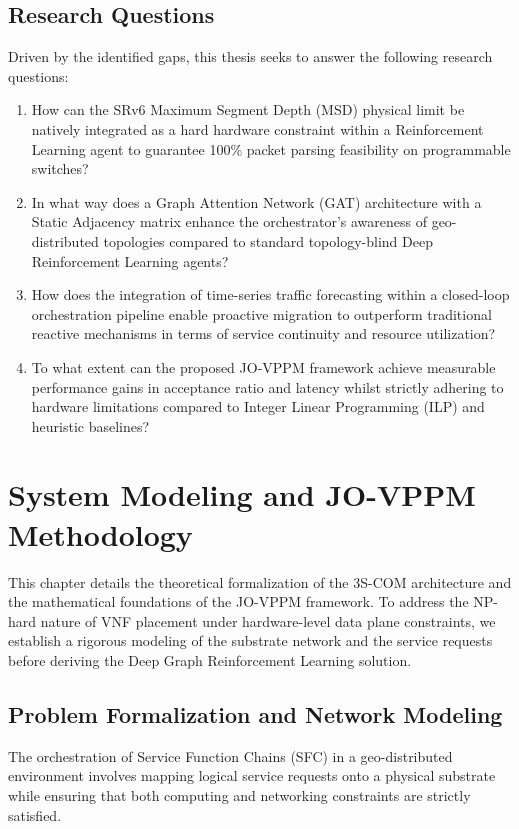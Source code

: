 \documentclass[12pt, a4paper, reqno, oneside]{book}
\begin{document}
\section{Research Questions}
\label{sec:rqs}
Driven by the identified gaps, this thesis seeks to answer the following research questions:

\begin{enumerate}[label=RQ\arabic*., leftmargin=*, nosep]
    \item How can the SRv6 Maximum Segment Depth (MSD) physical limit be natively integrated as a hard hardware constraint within a Reinforcement Learning agent to guarantee 100\% packet parsing feasibility on programmable switches?
    
    \item In what way does a Graph Attention Network (GAT) architecture with a Static Adjacency matrix enhance the orchestrator's awareness of geo-distributed topologies compared to standard topology-blind Deep Reinforcement Learning agents?
    
    \item How does the integration of time-series traffic forecasting within a closed-loop orchestration pipeline enable proactive migration to outperform traditional reactive mechanisms in terms of service continuity and resource utilization?
    
    \item To what extent can the proposed JO-VPPM framework achieve measurable performance gains in acceptance ratio and latency whilst strictly adhering to hardware limitations compared to Integer Linear Programming (ILP) and heuristic baselines?
\end{enumerate}


\chapter{System Modeling and JO-VPPM Methodology}
\label{chap:method}

This chapter details the theoretical formalization of the 3S-COM architecture and the mathematical foundations of the JO-VPPM framework. To address the NP-hard nature of VNF placement under hardware-level data plane constraints, we establish a rigorous modeling of the substrate network and the service requests before deriving the Deep Graph Reinforcement Learning solution.

\section{Problem Formalization and Network Modeling}
\label{sec:math_modeling}
The orchestration of Service Function Chains (SFC) in a geo-distributed environment involves mapping logical service requests onto a physical substrate while ensuring that both computing and networking constraints are strictly satisfied.
\end{document}

